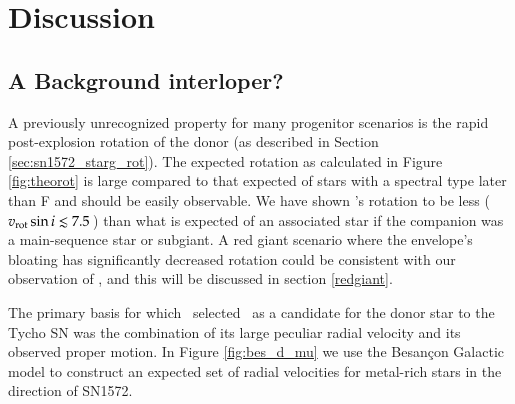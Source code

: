 \section{Discussion}


\subsection{A Background interloper?}
\label{sec:sn1006:interloper}
A previously unrecognized property for many progenitor scenarios is the rapid post-explosion rotation of the donor (as described in Section \ref{sec:sn1572_starg_rot}).
The expected rotation as calculated in Figure \ref{fig:theorot} is
large compared to that expected of stars with a spectral type later
than F and should be easily observable. We have shown \starg's rotation to be less ($v_{\rm rot} \sin{i} \lesssim 7.5 $\,\kms) than what is expected  of an associated star if the companion was a main-sequence star or subgiant. A red giant scenario where the envelope's bloating has significantly decreased rotation could be consistent with our observation of \starg, and this will be discussed in section \ref{redgiant}.

The primary basis for which \rl\ selected \starg\ as a candidate for
the donor star to the Tycho SN was the combination of its large peculiar radial velocity
and its observed proper motion. In Figure \ref{fig:bes_d_mu} we
use the Besan\c{c}on Galactic model \citep{2003A&A...409..523R} to
construct an expected set of radial velocities for metal-rich stars in the
direction of SN1572.

